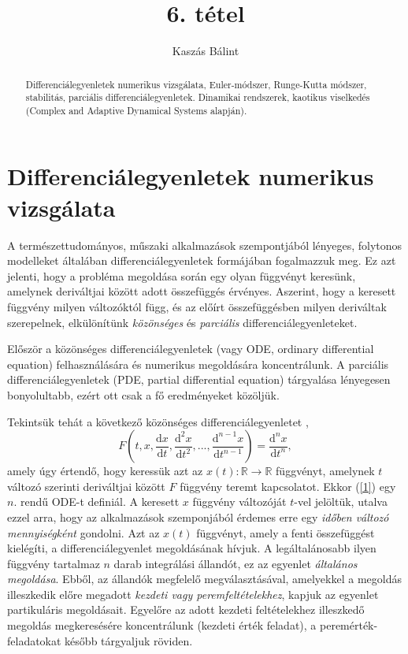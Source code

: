 \documentclass[12pt]{article}
\theoremstyle{plain}
\newcommand{\rtor}{
\mathbb{R} \to \mathbb{R}
}
\begin{document}
\title{6. tétel}
\author{Kaszás Bálint}

\maketitle


\newpage
\begin{abstract}
    Differenciálegyenletek numerikus vizsgálata, Euler-módszer, Runge-Kutta módszer, stabilitás, parciális differenciálegyenletek. Dinamikai rendszerek, kaotikus viselkedés (Complex and Adaptive Dynamical Systems alapján).
\end{abstract}

\section{Differenciálegyenletek numerikus vizsgálata}
A természettudományos, műszaki alkalmazások szempontjából lényeges, folytonos modelleket általában differenciálegyenletek formájában fogalmazzuk meg. Ez azt jelenti, hogy a probléma megoldása során egy olyan függvényt keresünk, amelynek deriváltjai között adott összefüggés érvényes. Aszerint, hogy a keresett függvény milyen változóktól függ, és az előírt összefüggésben milyen deriváltak szerepelnek, elkülönítünk {\em közönséges} és {\em parciális} differenciálegyenleteket. 

Először a közönséges differenciálegyenletek (vagy ODE, ordinary differential equation) felhasználására és numerikus megoldására koncentrálunk. A parciális differenciálegyenletek (PDE, partial differential equation) tárgyalása lényegesen bonyolultabb, ezért ott csak a fő eredményeket közöljük.

Tekintsük tehát a következő közönséges differenciálegyenletet \cite{ode},
\begin{equation}
    \label{1}
    F\left(t, x, \frac{\text{d}x}{\text{d}t}, \frac{\text{d}^2x}{\text{d}t^2}, ..., \frac{\text{d}^{n-1}x}{\text{d}t^{n-1}}\right) = \frac{\text{d}^nx}{\text{d}t^n},
\end{equation}
amely úgy értendő, hogy keressük azt az $x(t) : \rtor$ függvényt, amelynek $t$ változó szerinti deriváltjai között $F$ függvény teremt kapcsolatot. Ekkor (\ref{1}) egy $n$. rendű ODE-t definiál. A keresett $x$ függvény változóját $t$-vel jelöltük, utalva ezzel arra, hogy az alkalmazások szemponjából érdemes erre egy {\em időben változó mennyiségként} gondolni.  Azt az $x(t)$ függvényt, amely a fenti összefüggést kielégíti, a differenciálegyenlet megoldásának hívjuk. A legáltalánosabb ilyen függvény tartalmaz $n$ darab integrálási állandót, ez az egyenlet {\em általános megoldása}. Ebből, az állandók megfelelő megválasztásával, amelyekkel a megoldás illeszkedik előre megadott {\em kezdeti vagy peremfeltételekhez}, kapjuk az egyenlet partikuláris megoldásait. Egyelőre az adott kezdeti feltételekhez illeszkedő megoldás megkeresésére koncentrálunk (kezdeti érték feladat), a peremérték-feladatokat később tárgyaljuk röviden.
\end{document}
